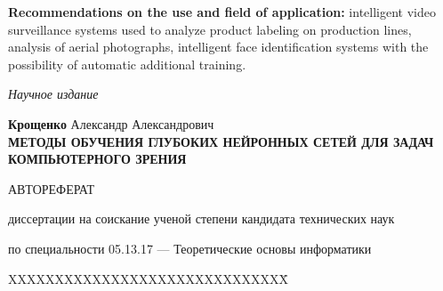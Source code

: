 \documentclass{thesisby}
\begin{document}
\textbf{Recommendations on the use and field of application:}
intelligent video surveillance systems used to analyze product labeling on production lines, analysis of aerial photographs, intelligent face identification systems with the possibility of automatic additional training.

\newpage
\thispagestyle{empty}

\vspace* {0.5cm}

\begin{center}
\textit{Научное издание}

\vspace*{\fill}

\textbf{Крощенко} Александр Александрович\\[25mm]
 {\large\bf МЕТОДЫ ОБУЧЕНИЯ ГЛУБОКИХ НЕЙРОННЫХ СЕТЕЙ ДЛЯ ЗАДАЧ КОМПЬЮТЕРНОГО ЗРЕНИЯ \\}
 
\vspace* {2cm}

 
АВТОРЕФЕРАТ
 
диссертации на соискание ученой степени кандидата технических наук

\vspace* {1cm}

по специальности 05.13.17 — Теоретические основы информатики

\end{center}

\vspace*{\fill}\vspace*{\fill} \vspace*{\fill} \vspace*{\fill}
\begin{tabbing}
XXXXXXXXXXXXXXXXXXXXXXXXXXXXXX\= \kill
\end{tabbing}

\begin{center}



\end{center}
\end{document}
